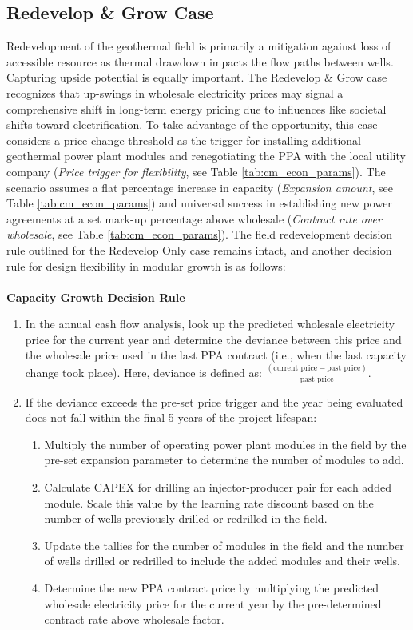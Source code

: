 \subsection{Redevelop \& Grow Case}\label{ch4:flex_grow_case}
Redevelopment of the geothermal field is primarily a mitigation against loss of accessible resource as thermal drawdown impacts the flow paths between wells. Capturing upside potential is equally important. The Redevelop \& Grow case recognizes that up-swings in wholesale electricity prices may signal a comprehensive shift in long-term energy pricing due to influences like societal shifts toward electrification. To take advantage of the opportunity, this case considers a price change threshold as the trigger for installing additional geothermal power plant modules and renegotiating the PPA with the local utility company (\textit{Price trigger for flexibility}, see Table \ref{tab:cm_econ_params}). The scenario assumes a flat percentage increase in capacity (\textit{Expansion amount}, see Table \ref{tab:cm_econ_params}) and universal success in establishing new power agreements at a set mark-up percentage above wholesale (\textit{Contract rate over wholesale}, see Table \ref{tab:cm_econ_params}). The field redevelopment decision rule outlined for the Redevelop Only case remains intact, and another decision rule for design flexibility in modular growth is as follows:
\\
\\
\textbf{Capacity Growth Decision Rule}\label{ch4:dr_grow}
\begin{enumerate}
    \item In the annual cash flow analysis, look up the predicted wholesale electricity price for the current year and determine the deviance between this price and the wholesale price used in the last PPA contract (i.e., when the last capacity change took place). Here, deviance is defined as: \(\frac{(\text{current price} - \text{past price})}{\text{past price}}\).
    \item If the deviance exceeds the pre-set price trigger and the year being evaluated does not fall within the final 5 years of the project lifespan:
    \begin{enumerate}
        \item Multiply the number of operating power plant modules in the field by the pre-set expansion parameter to determine the number of modules to add.
        \item Calculate CAPEX for drilling an injector-producer pair for each added module. Scale this value by the learning rate discount based on the number of wells previously drilled or redrilled in the field.
        \item Update the tallies for the number of modules in the field and the number of wells drilled or redrilled to include the added modules and their wells.
        \item Determine the new PPA contract price by multiplying the predicted wholesale electricity price for the current year by the pre-determined contract rate above wholesale factor.
    \end{enumerate}
\end{enumerate}

